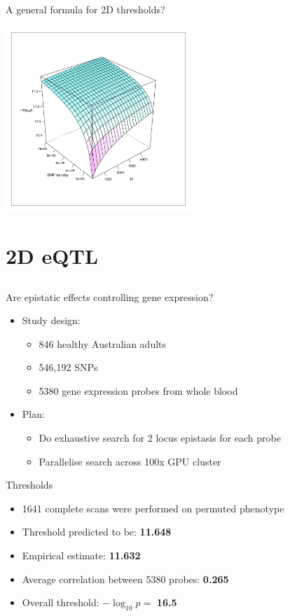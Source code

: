 \documentclass{beamer}
\begin{document}
\begin{frame}{A general formula for 2D thresholds?}
\begin{center}
\includegraphics[height=7cm]{threshold_function.pdf}
\end{center}
\end{frame}


\section{2D eQTL}
\subsection{}

\begin{frame}{Are epistatic effects controlling gene expression?}
\begin{itemize}
\item Study design:
\begin{itemize}
\item 846 healthy Australian adults
\item 546,192 SNPs
\item 5380 gene expression probes from whole blood
\end{itemize}
\item Plan:
\begin{itemize}
\item Do exhaustive search for 2 locus epistasis for each probe
\item Parallelise search across 100x GPU cluster
\end{itemize}
\end{itemize}
\end{frame}

\begin{frame}{Thresholds}
\begin{itemize}
\item 1641 complete scans were performed on permuted phenotype
\item Threshold predicted to be: \textbf{11.648}
\item Empirical estimate: \textbf{11.632}
\item Average correlation between 5380 probes: \textbf{0.265}
\item Overall threshold: $-\log_{10}p =$ \textbf{16.5}
\end{itemize}
\end{frame}
\end{document}
